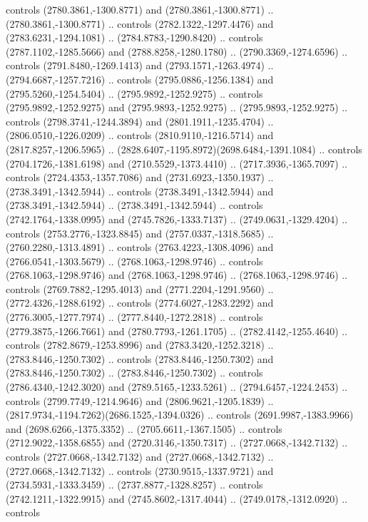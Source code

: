 \begin{scope}[shift={(28.3138,-376.6591)}]
\begin{scope}[shift={(-2186.6262,1813.8454)}]
      controls (2780.3861,-1300.8771) and (2780.3861,-1300.8771) ..
      (2780.3861,-1300.8771) .. controls (2782.1322,-1297.4476) and
      (2783.6231,-1294.1081) .. (2784.8783,-1290.8420) .. controls
      (2787.1102,-1285.5666) and (2788.8258,-1280.1780) .. (2790.3369,-1274.6596) ..
      controls (2791.8480,-1269.1413) and (2793.1571,-1263.4974) ..
      (2794.6687,-1257.7216) .. controls (2795.0886,-1256.1384) and
      (2795.5260,-1254.5404) .. (2795.9892,-1252.9275) .. controls
      (2795.9892,-1252.9275) and (2795.9893,-1252.9275) .. (2795.9893,-1252.9275) ..
      controls (2798.3741,-1244.3894) and (2801.1911,-1235.4704) ..
      (2806.0510,-1226.0209) .. controls (2810.9110,-1216.5714) and
      (2817.8257,-1206.5965) .. (2828.6407,-1195.8972)(2698.6484,-1391.1084) ..
      controls (2704.1726,-1381.6198) and (2710.5529,-1373.4410) ..
      (2717.3936,-1365.7097) .. controls (2724.4353,-1357.7086) and
      (2731.6923,-1350.1937) .. (2738.3491,-1342.5944) .. controls
      (2738.3491,-1342.5944) and (2738.3491,-1342.5944) .. (2738.3491,-1342.5944) ..
      controls (2742.1764,-1338.0995) and (2745.7826,-1333.7137) ..
      (2749.0631,-1329.4204) .. controls (2753.2776,-1323.8845) and
      (2757.0337,-1318.5685) .. (2760.2280,-1313.4891) .. controls
      (2763.4223,-1308.4096) and (2766.0541,-1303.5679) .. (2768.1063,-1298.9746) ..
      controls (2768.1063,-1298.9746) and (2768.1063,-1298.9746) ..
      (2768.1063,-1298.9746) .. controls (2769.7882,-1295.4013) and
      (2771.2204,-1291.9560) .. (2772.4326,-1288.6192) .. controls
      (2774.6027,-1283.2292) and (2776.3005,-1277.7974) .. (2777.8440,-1272.2818) ..
      controls (2779.3875,-1266.7661) and (2780.7793,-1261.1705) ..
      (2782.4142,-1255.4640) .. controls (2782.8679,-1253.8996) and
      (2783.3420,-1252.3218) .. (2783.8446,-1250.7302) .. controls
      (2783.8446,-1250.7302) and (2783.8446,-1250.7302) .. (2783.8446,-1250.7302) ..
      controls (2786.4340,-1242.3020) and (2789.5165,-1233.5261) ..
      (2794.6457,-1224.2453) .. controls (2799.7749,-1214.9646) and
      (2806.9621,-1205.1839) .. (2817.9734,-1194.7262)(2686.1525,-1394.0326) ..
      controls (2691.9987,-1383.9966) and (2698.6266,-1375.3352) ..
      (2705.6611,-1367.1505) .. controls (2712.9022,-1358.6855) and
      (2720.3146,-1350.7317) .. (2727.0668,-1342.7132) .. controls
      (2727.0668,-1342.7132) and (2727.0668,-1342.7132) .. (2727.0668,-1342.7132) ..
      controls (2730.9515,-1337.9721) and (2734.5931,-1333.3459) ..
      (2737.8877,-1328.8257) .. controls (2742.1211,-1322.9915) and
      (2745.8602,-1317.4044) .. (2749.0178,-1312.0920) .. controls

\end{scope}
\end{scope}
